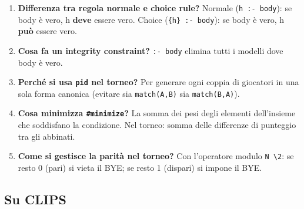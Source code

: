 \documentclass[12pt,a4paper]{article}
\begin{document}
\begin{enumerate}
  \item \textbf{Differenza tra regola normale e choice rule?}
        Normale (\texttt{h :- body}): se body è vero, h \textbf{deve} essere vero.
        Choice (\texttt{\{h\} :- body}): se body è vero, h \textbf{può} essere vero.

  \item \textbf{Cosa fa un integrity constraint?}
        \texttt{:- body} elimina tutti i modelli dove body è vero.

  \item \textbf{Perché si usa \texttt{pid} nel torneo?}
        Per generare ogni coppia di giocatori in una sola forma canonica
        (evitare sia \texttt{match(A,B)} sia \texttt{match(B,A)}).

  \item \textbf{Cosa minimizza \texttt{\#minimize}?}
        La somma dei pesi degli elementi dell'insieme che soddisfano la condizione.
        Nel torneo: somma delle differenze di punteggio tra gli abbinati.

  \item \textbf{Come si gestisce la parità nel torneo?}
        Con l'operatore modulo \texttt{N \textbackslash 2}: se resto 0 (pari) si
        vieta il BYE; se resto 1 (dispari) si impone il BYE.
\end{enumerate}

\subsection{Su CLIPS}
\end{document}
